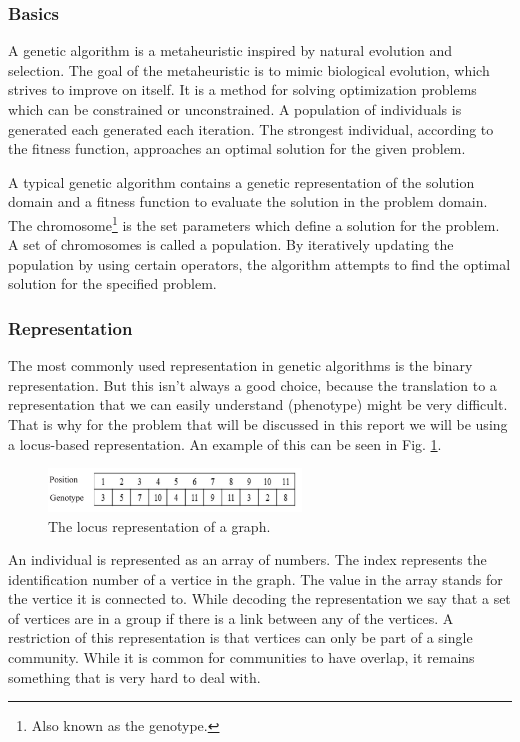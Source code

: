 \subsubsection{Basics}
A genetic algorithm is a metaheuristic inspired by natural evolution and selection.
The goal of the metaheuristic is to mimic biological evolution, which strives to improve on itself.
It is a method for solving optimization problems which can be constrained or unconstrained.
A population of individuals is generated each generated each iteration.
The strongest individual, according to the fitness function, approaches an optimal solution for the given problem.

A typical genetic algorithm contains a genetic representation of the solution domain and a fitness function to evaluate the solution in the problem domain.
The chromosome\footnote{Also known as the genotype.} is the set parameters which define a solution for the problem.
A set of chromosomes is called a population.
By iteratively updating the population by using certain operators, the algorithm attempts to find the optimal solution for the specified problem.

\subsubsection{Representation}
The most commonly used representation in genetic algorithms is the binary representation.
But this isn't always a good choice, because the translation to a representation that we can easily understand (phenotype) might be very difficult.
That is why for the problem that will be discussed in this report we will be using a locus-based representation.
An example of this can be seen in Fig. \ref{figure:locus}.

\begin{figure}
\begin{center}
\includegraphics[width=0.6\textwidth]{images/locus.png}
\caption{The locus representation of a graph.}\label{figure:locus}
\end{center}
\end{figure}

An individual is represented as an array of numbers. 
The index represents the identification number of a vertice in the graph.
The value in the array stands for the vertice it is connected to.
While decoding the representation we say that a set of vertices are in a group if there is a link between any of the vertices.
A restriction of this representation is that vertices can only be part of a single community.
While it is common for communities to have overlap, it remains something that is very hard to deal with.

